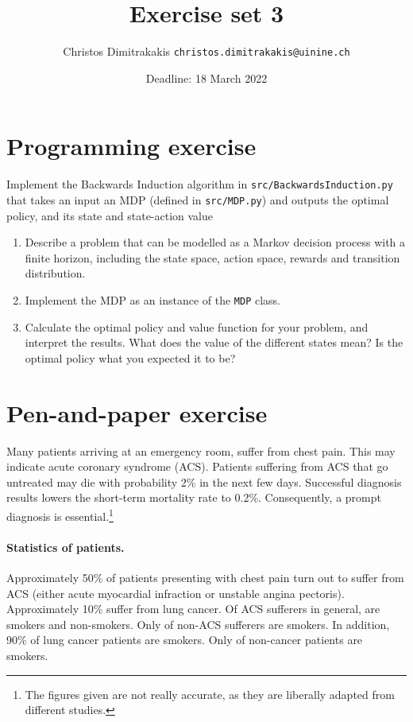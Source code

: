 \documentclass[twoside,a4paper]{article}
\begin{document}
\title{Exercise set 3}
\author{Christos Dimitrakakis  \texttt{christos.dimitrakakis@uinine.ch}}
\date{Deadline: 18 March 2022}
\maketitle

\section{Programming exercise}
\begin{exercise}[In class] Implement the Backwards Induction algorithm in \verb!src/BackwardsInduction.py! that takes an input an MDP (defined in \verb|src/MDP.py|) and outputs the optimal policy, and its state and state-action value
\end{exercise}

\begin{exercise}
  \begin{enumerate}  
  \item Describe a problem that can be modelled as a Markov decision process with a finite horizon, including the state space, action space, rewards and transition distribution.
  \item Implement the MDP as an instance of the \verb|MDP| class.
  \item Calculate the optimal policy and value function for your problem, and interpret the results. What does the value of the different states mean? Is the optimal policy what you expected it to be? 
  \end{enumerate}
\end{exercise}

\section{Pen-and-paper exercise}

Many patients arriving at an emergency room, suffer from chest pain. This may indicate acute coronary syndrome (ACS). Patients suffering from ACS that go untreated may die with probability 2\% in the next few days. Successful diagnosis results lowers the short-term mortality rate to 0.2\%. Consequently, a prompt diagnosis is essential.\footnote{The figures given are not really accurate, as they are liberally adapted from different studies.}

\paragraph{Statistics of patients.}
Approximately 50\% of patients presenting with chest pain turn out to suffer from ACS (either acute myocardial infraction or unstable angina pectoris). Approximately 10\% suffer from lung cancer. Of ACS sufferers in general,  are smokers and  non-smokers. Only  of non-ACS sufferers are smokers. In addition, 90\% of lung cancer patients are smokers.
Only  of non-cancer patients are smokers.
\end{document}
